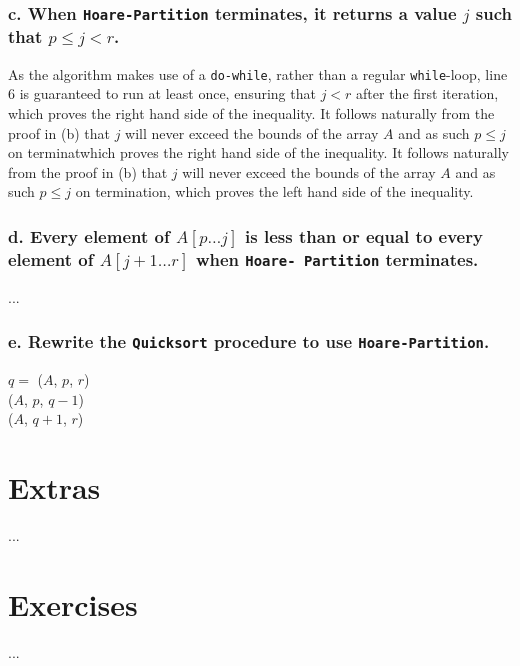 \documentclass[11pt,english]{article}
\begin{document}
\subsubsection*{\large c. \mdseries When \texttt{Hoare-Partition} terminates,
it returns a value $j$ such that $p \leq j < r$.}
As the algorithm makes use of a \texttt{do-while}, rather than a regular
\texttt{while}-loop, line 6 is guaranteed to run at least once, ensuring that
$j < r$ after the first iteration, which proves the right hand side of the
inequality. It follows naturally from the proof in (b) that $j$ will never
exceed the bounds of the array $A$ and as such $p \leq j$ on terminatwhich proves the right hand side of the
inequality. It follows naturally from the proof in (b) that $j$ will never
exceed the bounds of the array $A$ and as such $p \leq j$ on termination,
which proves the left hand side of the inequality. 

\subsubsection*{\large d. \mdseries Every element of $A[p \dots j]$ is less
than or equal to every element of $A[j + 1 \dots r]$ when \texttt{Hoare-
Partition} terminates.}
...

\subsubsection*{\large e. \mdseries Rewrite the \texttt{Quicksort} procedure
to use \texttt{Hoare-Partition}.}
\begin{algorithm}
	
	\BlankLine
	
	{
		$q =$ \Hoare($A$, $p$, $r$) \\
		\Quicksort($A$, $p$, $q - 1$) \\
		\Quicksort($A$, $q + 1$, $r$)
	}
\end{algorithm}






\newpage
\section*{Extras}
...


\newpage
\pagestyle{fancy}

\section*{Exercises}
...
\end{document}

